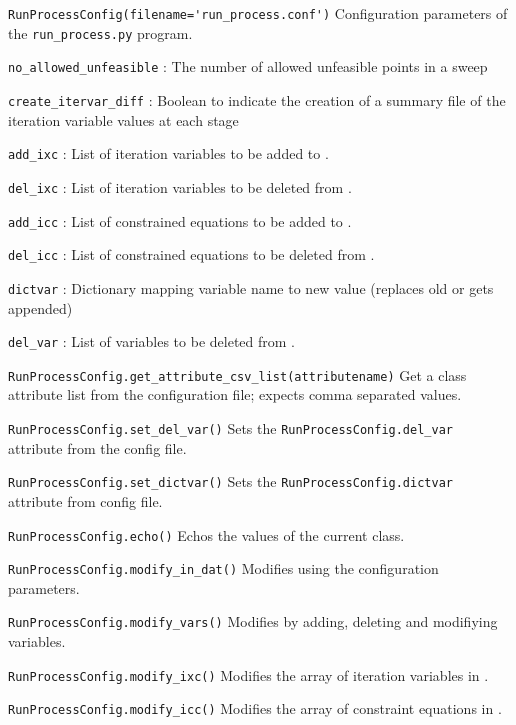 \begin{description}

\item{\verb|RunProcessConfig(filename='run_process.conf')|} Configuration
  parameters of the \verb|run_process.py| program.

  \verb|no_allowed_unfeasible| : The number of allowed unfeasible points in a
  sweep

  \verb|create_itervar_diff| : Boolean to indicate the creation of a summary
  file of the iteration variable values at each stage

  \verb|add_ixc| : List of iteration variables to be added to \indat.

  \verb|del_ixc| : List of iteration variables to be deleted from \indat.

  \verb|add_icc| : List of constrained equations to be added to \indat.

  \verb|del_icc| : List of constrained equations to be deleted from \indat.

  \verb|dictvar| : Dictionary mapping variable name to new value (replaces old
  or gets appended)

  \verb|del_var| : List of variables to be deleted from \indat.

\item{\verb|RunProcessConfig.get_attribute_csv_list(attributename)|} Get a
  class attribute list from the configuration file; expects comma separated
  values.

\item{\verb|RunProcessConfig.set_del_var()|} Sets the
  \verb|RunProcessConfig.del_var| attribute from the config file.

\item{\verb|RunProcessConfig.set_dictvar()|} Sets the
  \verb|RunProcessConfig.dictvar| attribute from config file.

\item{\verb|RunProcessConfig.echo()|} Echos the values of the current class.

\item{\verb|RunProcessConfig.modify_in_dat()|} Modifies \indat\/ using the
  configuration parameters.

\item{\verb|RunProcessConfig.modify_vars()|} Modifies \indat\/ by adding,
  deleting and modifiying variables.

\item{\verb|RunProcessConfig.modify_ixc()|} Modifies the array of iteration
  variables in \indat.

\item{\verb|RunProcessConfig.modify_icc()|} Modifies the array of constraint
  equations in \indat.

\end{description}

